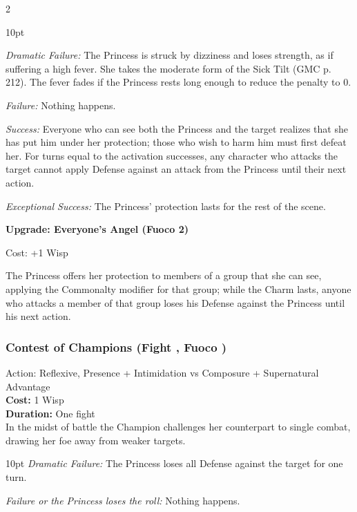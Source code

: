 \begin{multicols}{2}
\begin{myindentpar}{10pt} 

\emph{Dramatic Failure:} The Princess is struck by dizziness and loses strength, as if suffering a high fever. She takes the moderate form of the Sick Tilt (GMC p. 212). The fever fades if the Princess rests long enough to reduce the penalty to 0.

\emph{Failure:} Nothing happens. 

\emph{Success:} Everyone who can see both the Princess and the target realizes that she has put him under her protection; those who wish to harm him must first defeat her. For turns equal to the activation successes, any character who attacks the target cannot apply Defense against an attack from the Princess until their next action.

\emph{Exceptional Success:} The Princess' protection lasts for the rest of the scene.

\textbf{Upgrade: Everyone's Angel (Fuoco 2)} 

Cost: +1 Wisp

The Princess offers her protection to members of a group that she can see, applying the Commonalty modifier for that group; while the Charm lasts, anyone who attacks a member of that group loses his Defense against the Princess until his next action.\end{myindentpar}


\subsubsection*{Contest of Champions (Fight \textbullet\textbullet, Fuoco \textbullet\textbullet)}

Action: Reflexive, Presence + Intimidation vs Composure + Supernatural Advantage\\

\noindent \textbf{Cost:} 1 Wisp\\

\noindent \textbf{Duration:} One fight\\

\noindent In the midst of battle the Champion challenges her counterpart to single combat, drawing her foe away from weaker targets.

\begin{myindentpar}{10pt} 
\emph{Dramatic Failure:} The Princess loses all Defense against the target for one turn.

\emph{Failure or the Princess loses the roll:} Nothing happens.


\end{myindentpar}
\end{multicols}
